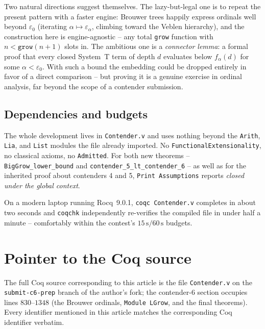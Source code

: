 \documentclass[11pt,a4paper]{article}
\theoremstyle{plain}
\theoremstyle{definition}
\theoremstyle{remark}
\begin{document}
Two natural directions suggest themselves.  The lazy-but-legal one is
to repeat the present pattern with a faster engine: Brouwer trees
happily express ordinals well beyond $\varepsilon_0$ (iterating
$\alpha \mapsto \varepsilon_\alpha$, climbing toward the Veblen
hierarchy), and the construction here is engine-agnostic -- any total
\texttt{grow} function with $n < \texttt{grow}(n+1)$ slots in.  The
ambitious one is a \emph{connector lemma}: a formal proof that every
closed System~T term of depth $d$ evaluates below $f_\alpha(d)$ for
some $\alpha < \varepsilon_0$.  With such a bound the embedding could
be dropped entirely in favor of a direct comparison -- but proving it
is a genuine exercise in ordinal analysis, far beyond the scope of a
contender submission.

\subsection{Dependencies and budgets}

The whole development lives in \texttt{Contender.v} and uses nothing
beyond the \texttt{Arith}, \texttt{Lia}, and \texttt{List} modules the
file already imported.  No \texttt{FunctionalExtensionality}, no
classical axioms, no \texttt{Admitted}.  For both new theorems --
\texttt{BigGrow\_lower\_bound} and
\texttt{contender\_5\_lt\_contender\_6} -- as well as for the
inherited proof about contenders 4 and 5,
\texttt{Print Assumptions} reports \emph{closed under the global
context}.

On a modern laptop running Rocq~9.0.1, \texttt{coqc Contender.v}
completes in about two seconds and \texttt{coqchk} independently
re-verifies the compiled file in under half a minute -- comfortably
within the contest's $15\,\text{s}/60\,\text{s}$ budgets.

\bigskip\noindent
\hrulefill

\appendix
\section{Pointer to the Coq source}

The full Coq source corresponding to this article is the file
\texttt{Contender.v} on the \texttt{submit-c6-prep} branch of the
author's fork; the contender-6 section occupies lines $830$--$1348$
(the Brouwer ordinals, \texttt{Module LGrow}, and the final theorems).
Every identifier mentioned in this article matches the corresponding
Coq identifier verbatim.
\end{document}
